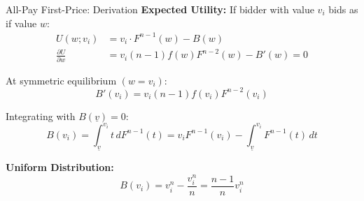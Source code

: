 \documentclass[xcolor={x11names}, aspectratio=169 ]{beamer}
\begin{document}
\begin{frame}{All-Pay First-Price: Derivation}
\textbf{Expected Utility:} If bidder with value $v_i$ bids as if value $w$:
\begin{align*}
U(w; v_i) &= v_i \cdot F^{n-1}(w) - B(w) \\
\frac{\partial U}{\partial w} &= v_i(n-1)f(w)F^{n-2}(w) - B'(w) = 0
\end{align*}

At symmetric equilibrium $(w = v_i)$:
$$B'(v_i) = v_i(n-1)f(v_i)F^{n-2}(v_i)$$

Integrating with $B(\underline{v}) = 0$:
$$B(v_i) = \int_{\underline{v}}^{v_i} t \, dF^{n-1}(t) = v_i F^{n-1}(v_i) - \int_{\underline{v}}^{v_i} F^{n-1}(t) \, dt$$

\textbf{Uniform Distribution:}
$$B(v_i) = v_i^n - \frac{v_i^n}{n} = \frac{n-1}{n} v_i^n$$
\end{frame}
\end{document}
